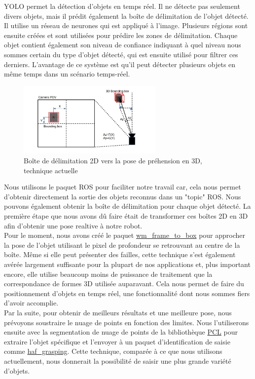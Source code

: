 \documentclass[runningheads,a4paper]{llncs}
\begin{document}
YOLO permet la détection d'objets en temps réel. Il ne détecte pas seulement divers objets, mais il prédit également la boîte de délimitation de l'objet détecté. Il utilise un réseau de neurones qui est appliqué à l'image. Plusieurs régions sont ensuite créées et sont utilisées pour prédire les zones de délimitation. Chaque objet contient également son niveau de confiance indiquant à quel niveau nous sommes certain du type d'objet détecté, qui est ensuite utilisé pour filtrer ces derniers. L'avantage de ce système est qu'il peut détecter plusieurs objets en même temps dans un scénario temps-réel. \\

 
\begin{figure}
  \centering
  \includegraphics[width=200pt]{images/frame_to_box.png}
  \caption{Boîte de délimitation 2D vers la pose de préhension en 3D, technique actuelle}
\end{figure} 
 
Nous utilisons le paquet ROS pour faciliter notre travail car, cela nous permet d'obtenir directement la sortie des objets reconnus dans un "topic" ROS. Nous pouvons également obtenir la boîte de délimitation pour chaque objet détecté. La première étape que nous avons dû faire était de transformer ces boîtes 2D en 3D afin d'obtenir une pose realtive à notre robot. \\

Pour le moment, nous avons créé le paquet \href{https://github.com/WalkingMachine/wm_frame_to_box}{wm\_frame\_to\_box} pour approcher la pose de l'objet utilisant le pixel de profondeur se retrouvant au centre de la boîte. Même si elle peut présenter des failles, cette technique s'est également avérée largement suffisante pour la plupart de nos applications et, plus important encore, elle utilise beaucoup moins de puissance de traitement que la correspondance de formes 3D utilisée auparavant. Cela nous permet de faire du positionnement d'objets en temps réel, une fonctionnalité dont nous sommes fiers d'avoir accomplie. \\

Par la suite, pour obtenir de meilleurs résultats et une meilleure pose, nous prévoyons soustraire le nuage de points en fonction des limites. Nous l'utiliserons ensuite avec la segmentation de nuage de points de la bibliothèque \href{http://pointclouds.org}{PCL} pour extraire l'objet spécifique et l'envoyer à un paquet d'identification de saisie comme \href{http://wiki.ros.org/haf_grasping}{haf\_grasping}. Cette technique, comparée à ce que nous utilisons actuellement, nous donnerait la possibilité de saisir une plus grande variété d'objets. \\
\end{document}
